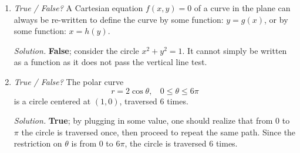 \documentclass{article}
\begin{document}
\begin{enumerate}
\item {\em True / False?} A Cartesian equation $f(x, y) = 0$ of a curve in the plane can always be re-written to define the curve by some function: $y = g(x)$, or by some function: $x = h(y)$.

{\em Solution.} {\bf False}; consider the circle $x^2 + y^2 = 1$. It cannot simply be written as a function as it does not pass the vertical line test.

\item {\em True / False?} The polar curve
\[
r = 2 \cos \theta, ~~~~ 0 \le \theta \le 6 \pi
\]
is a circle centered at $(1, 0)$, traversed $6$ times.

{\em Solution.} {\bf True}; by plugging in some value, one should realize that from $0$ to $\pi$ the circle is traversed once, then proceed to repeat the same path. Since the restriction on $\theta$ is from $0$ to $6 \pi$, the circle is traversed $6$ times.
\end{enumerate}
\end{document}

